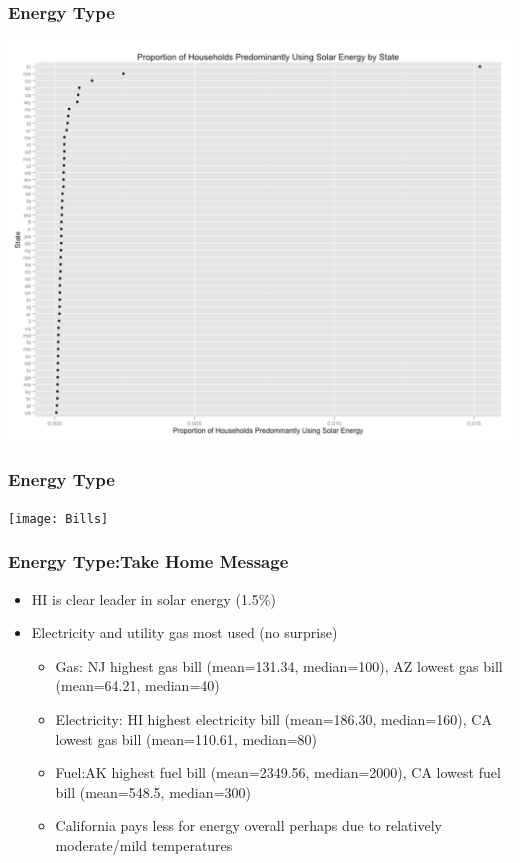 \documentclass{beamer}
\begin{document}
\begin{frame}
\frametitle{Energy Type}
\begin{center} 
\includegraphics[width=.7 \textwidth]{SolarProp}

\end{center}
\end{frame}


\begin{frame}
\frametitle{Energy Type}
\begin{center} 
\texttt{[image: Bills]}

\end{center}
\end{frame}

\begin{frame}
\frametitle{Energy Type:Take Home Message}
\begin{itemize}
\item HI is clear leader in solar energy (1.5\%)
\item Electricity and utility gas most used (no surprise)
\begin{itemize}
\item Gas: NJ highest gas bill (mean=131.34, median=100), AZ lowest gas bill (mean=64.21, median=40)
\item Electricity: HI highest electricity bill (mean=186.30, median=160), CA lowest gas bill (mean=110.61, median=80)
\item Fuel:AK highest fuel bill (mean=2349.56, median=2000), CA lowest fuel bill (mean=548.5, median=300)
\item California pays less for energy overall perhaps due to relatively moderate/mild temperatures
\end{itemize}
\end{itemize}
\end{frame}
\end{document}
